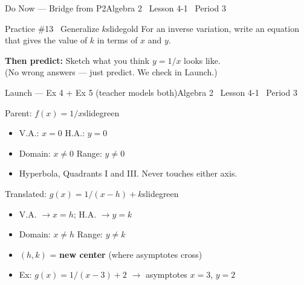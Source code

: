 \documentclass[aspectratio=169, 11pt]{beamer}
\begin{document}

\begin{frame}{Do Now --- Bridge from P2}{Algebra 2 \textperiodcentered\ Lesson 4-1 \textperiodcentered\ Period 3}
\vspace{0.2cm}
\begin{projcard}{Practice \#13 \textperiodcentered\ Generalize \(k\)}{slidegold}
For an inverse variation, write an equation that gives the value of \(k\) in terms of \(x\) and \(y\).

\vspace{0.25cm}
\textbf{Then predict:} Sketch what you think \(y = 1/x\) looks like.\\
\small (No wrong answers --- just predict. We check in Launch.)
\end{projcard}
\end{frame}

\begin{frame}{Launch --- Ex 4 + Ex 5 (teacher models both)}{Algebra 2 \textperiodcentered\ Lesson 4-1 \textperiodcentered\ Period 3}
\vspace{0.1cm}
\begin{projcard}{Parent: \(f(x) = 1/x\)}{slidegreen}
\begin{itemize}
  \setlength{\itemsep}{0pt}
  \item V.A.: \(x = 0\) \quad H.A.: \(y = 0\)
  \item Domain: \(x \neq 0\) \quad Range: \(y \neq 0\)
  \item Hyperbola, Quadrants I and III. Never touches either axis.
\end{itemize}
\end{projcard}
\vspace{-0.2cm}
\begin{projcard}{Translated: \(g(x) = 1/(x-h) + k\)}{slidegreen}
\begin{itemize}
  \setlength{\itemsep}{0pt}
  \item V.A. \(\rightarrow x = h\); H.A. \(\rightarrow y = k\)
  \item Domain: \(x \neq h\) \quad Range: \(y \neq k\)
  \item \((h, k)\) = \textbf{new center} (where asymptotes cross)
  \item \textcolor{slideaccent}{Ex: \(g(x) = 1/(x-3)+2\) \(\rightarrow\) asymptotes \(x=3\), \(y=2\)}
\end{itemize}
\end{projcard}
\end{frame}
\end{document}
